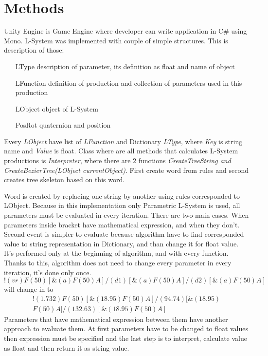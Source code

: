 \documentclass[b5paper,twoside,11pt]{article}
\begin{document}
\section{Methods}
Unity Engine is Game Engine where developer can write application in C\# using Mono. L-System was implemented with couple of simple structures. This is description of those:
\begin{itemize}[labelindent=5.5em,labelsep=1cm,leftmargin=*]
\item [LType] description of parameter, its definition as float and name of object
\item [LFunction] definition of production and collection of parameters used in this production
\item [LObject] object of L-System
\item [PosRot] quaternion and position
\end{itemize}
Every \textit{LObject} have list of \textit{LFunction} and Dictionary \textit{LType}, where \textit{Key} is string name and \textit{Value} is float.
Class where are all methods that calculates L-System productions is \textit{Interpreter}, where there are 2  functions \textit{CreateTreeString and} \textit{CreateBezierTree(LObject currentObject)}. First create word from rules and second creates tree skeleton based on this word. \par
Word is created by replacing one string by another using rules corresponded to LObject. Because in this implementation only Parametric L-System is used, all parameters must be evaluated in every iteration. There are two main cases. When parameters inside bracket have mathematical expression, and when they don't. Second event is simpler to evaluate because algorithm have to find corresponded value to string representation in Dictionary, and than change it for float value. It's performed only at the beginning of algorithm, and with every function. Thanks to this, algorithm does not need to change every parameter in every iteration, it's done only once.
\begin{equation*} 
!(vr)F(50)[ \&(a)F(50)A]/(d1)[ \&(a)F(50)A]/(d2)[ \&(a)F(50)A]
 \end{equation*}
will change in to
 \begin{multline*}
  !(1.732)F(50)[ \&(18.95)F(50)A]/(94.74)[ \&(18.95) \\
     F(50)A]/(132.63) [ \&(18.95)F(50)A] 
  \end{multline*}
  Parameters that have mathematical expression between them have another approach to evaluate them. At first parameters have to be changed to float values then expression must be specified and the last step is to interpret, calculate value as float and then return it as string value.
\end{document}
